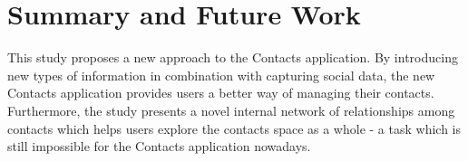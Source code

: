 \chapter{Summary and Future Work}
This study proposes a new approach to the Contacts application. By introducing new types of information in combination with capturing social data, the new Contacts application provides users a better way of managing their contacts. Furthermore, the study presents a novel internal network of relationships among contacts which helps users explore the contacts space as a whole - a task which is still impossible for the Contacts application nowadays.

